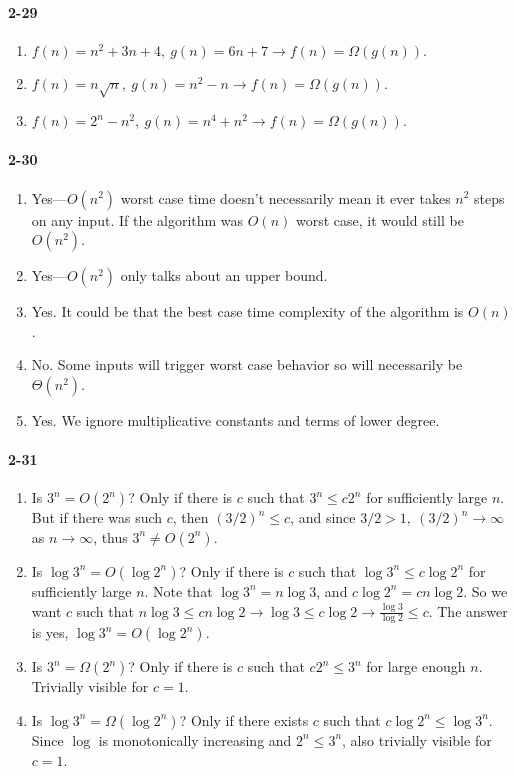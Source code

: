 \documentclass{report}
\begin{document}
\paragraph{2-29}
\begin{enumerate}[label=(\alph*)]
	\item $f(n) = n^2 + 3n + 4,\ g(n) = 6n + 7 \rightarrow f(n) = \Omega(g(n))$.
	\item $f(n) = n\sqrt{n},\ g(n)=n^2-n \rightarrow f(n) = \Omega(g(n))$.
	\item $f(n) = 2^n-n^2,\ g(n)=n^4+n^2 \rightarrow f(n) = \Omega(g(n))$.
\end{enumerate}

\paragraph{2-30}
\begin{enumerate}[label=(\alph*)]
	\item Yes---$O(n^2)$ worst case time doesn't necessarily mean it ever takes $n^2$ steps on any input. If the algorithm was $O(n)$ worst case, it would still be $O(n^2)$.
	\item Yes---$O(n^2)$ only talks about an upper bound.
	\item Yes. It could be that the best case time complexity of the algorithm is $O(n)$.
	\item No. Some inputs will trigger worst case behavior so will necessarily be $\Theta(n^2)$.
	\item Yes. We ignore multiplicative constants and terms of lower degree.
\end{enumerate}

\paragraph{2-31}
\begin{enumerate}[label=(\alph*)]
	\item Is $3^n = O(2^n)$? Only if there is $c$ such that $3^n \le c 2^n$ for sufficiently large $n$. But if there was such $c$, then $(3/2)^n \le c$, and since $3/2 > 1,\ (3/2)^n\to\infty$ as $n\to\infty$, thus $3^n \ne O(2^n)$.
	\item Is $\log 3^n = O(\log 2^n)$? Only if there is $c$ such that $\log 3^n \le c\log 2^n$ for sufficiently large $n$. Note that $\log 3^n = n\log 3$, and $c\log 2^n = cn\log 2$. So we want $c$ such that $n\log 3 \le cn\log2 \rightarrow \log 3 \le c\log2 \rightarrow \frac{\log 3}{\log 2} \le c$. The answer is yes, $\log 3^n = O(\log 2^n)$.
	\item Is $3^n = \Omega(2^n)$? Only if there is $c$ such that $c 2^n \le 3^n$ for large enough $n$. Trivially visible for $c=1$.
	\item Is $\log 3^n = \Omega(\log 2^n)$? Only if there exists $c$ such that $c\log 2^n \le \log 3^n$. Since $\log$ is monotonically increasing and $2^n \le 3^n$, also trivially visible for $c=1$.
\end{enumerate}
\end{document}
